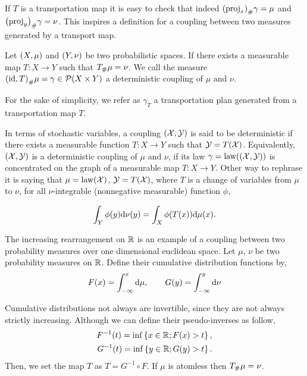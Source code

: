 If $T$ is a transportation map it is easy to check that indeed ${\left( \mathrm{proj}_x \right)}_{\#} \gamma=\mu$ and ${\left( \mathrm{proj}_y \right)}_{\#} \gamma=\nu$.  This inspires a definition for a coupling between two measures generated by a transport map. \\


\begin{definition}
Let $\left( X, \mu \right)$ and $\left( Y, \nu \right)$ be two probabilistic spaces. If there exists a measurable map $T:X\rightarrow Y$ such that ${T}_{\#} \mu=\nu$. We call the measure ${\left( \mathrm{id}, T \right)}_{\#} \mu=\gamma \in \mathcal{P}(X\times Y)$ a deterministic coupling of $\mu$ and $\nu$.
\end{definition}

For the sake of simplicity, we refer as $\gamma_T$ a transportation plan generated from a transportation map $T$.


In terms of stochastic variables, a coupling $(\mathcal{X},\mathcal{Y})$ is said to be deterministic if there exists a measurable function $T: X \rightarrow Y$ such that $\mathcal{Y} = T(\mathcal{X})$. Equivalently, $\left( \mathcal{X}, \mathcal{Y} \right)$ is a deterministic coupling of $\mu$ and $\nu$, if its law $\gamma=\mathrm{law}(\left( \mathcal{X},\mathcal{Y} \right))$ is concentrated on the graph of a measurable map $T:X\rightarrow Y$. Other way to rephrase it is saying that $\mu=\mathrm{law}(\mathcal{X})$, $\mathcal{Y}=T(\mathcal{X})$, where $T$ is a change of variables from $\mu$ to $\nu$, for all $\nu$-integrable (nonnegative measurable)  function $\phi$,

\begin{equation*}
	\int_Y \phi(y)\mathrm{d}\nu(y) = \int_X \phi(T(x))\mathrm{d}\mu(x).
\end{equation*}

The increasing rearrangement on $\mathbb{R}$ is an example of a coupling between two probability measures over one dimensional euclidean space. Let $\mu$, $\nu$ be two probability measures on $\mathbb{R}$. Define their cumulative distribution functions by,
\begin{equation*}
	F(x)=\int_{-\infty}^{x}\mathrm{d}\mu, \qquad G(y)=\int_{-\infty}^{y}\mathrm{d}\nu	
\end{equation*}

Cumulative distributions not always are invertible, since they are not always strictly increasing. Although we can define their pseudo-inverses as follow,
\begin{align}
	F^{-1}(t)=\inf\left\lbrace x\in \mathbb{R}; F(x)>t \right\rbrace, \label{eq: Increasing rearregement F}\\
	G^{-1}(t)=\inf\left\lbrace y\in \mathbb{R}; G(y)>t \right\rbrace. \label{eq: Increasing rearregement G}
\end{align}
Then, we set the map $T$ as $T=G^{-1}\circ F$. If $\mu$ is atomless then ${T}_{\#} \mu=\nu$.

